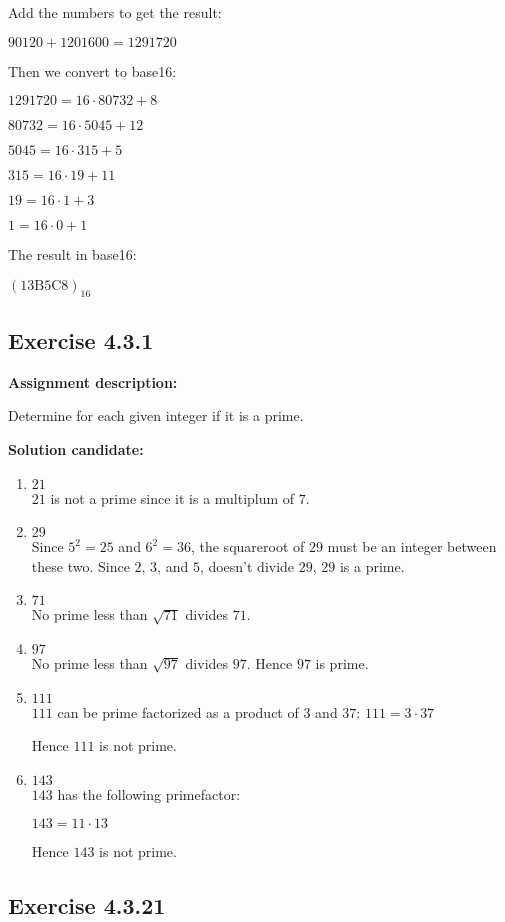 \documentclass{report}
\newcommand{\cent}[1]{\begin{center}#1\end{center}}
\newcommand{\assignmentDescription}{\textbf{Assignment description: }}
\newcommand{\solution}{\textbf{Solution candidate: }}
\newcommand{\Exercise}[1]{\subsection{Exercise #1}}
\newcommand{\defaultEnumerateLabel}{\textbf{\alph*.}}
\newcommand{\myItem}[1]{\item #1\\}
\newcommand{\hexadec}[1]{(\text{#1})_{16}}
\begin{document}
\begin{enumerate}[label=\defaultEnumerateLabel]
\begin{enumerate}[label = \defaultEnumerateLabel]
		Add the numbers to get the result:
		
		\cent{$90120+1201600 = 1291720$}
		
		Then we convert to base16:
		
		\cent{$1291720 = 16 \cdot 80732 +8$}
		\cent{$80732 = 16 \cdot 5045 +12$}
		\cent{$5045 = 16 \cdot 315 +5$}
		\cent{$315 = 16 \cdot 19 +11$}
		\cent{$19 = 16 \cdot 1 +3$}
		\cent{$1 = 16 \cdot 0 + 1$}
		
		The result in base16:
		
		\cent{$\hexadec{13B5C8}$}
	\end{enumerate}
	
	\Exercise{4.3.1}
	
	\assignmentDescription
	
	Determine for each given integer if it is a prime.
	
	\solution
	
	\begin{enumerate}[label=\defaultEnumerateLabel]
		\myItem{$21$}
		
		$21$ is not a prime since it is a multiplum of $7$.\\
		
		\myItem{$29$}
		
		Since $5^2 = 25$ and $6^2 = 36$, the squareroot of $29$ must be an integer between these two. Since $2$, $3$, and $5$, doesn't divide $29$, $29$ is a prime.\\
		
		\myItem{$71$}
		
		No prime less than $\sqrt{71}$ divides $71$.\\
		
		\myItem{$97$}
		
		No prime less than $\sqrt{97}$ divides $97$. Hence $97$ is prime.\\
		
		\myItem{$ 111 $}
		
		$111$ can be prime factorized as a product of $3$ and $37$:
		$ 111 = 3 \cdot 37$ 
		
		Hence $111$ is not prime. \\
		
		\myItem{$143$}
		
		$143$ has the following primefactor:
		
		\cent{$143 = 11 \cdot 13$}
		
		Hence $143$ is not prime.\\
		
	\end{enumerate}
	\Exercise{4.3.21}
	

\end{enumerate}
\end{document}
